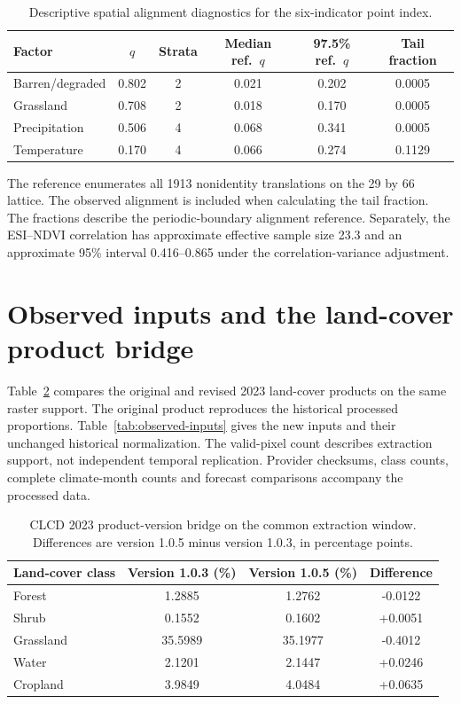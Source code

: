 \documentclass[preprint,11pt,authoryear]{elsarticle}
\begin{document}
\begin{table}[htbp]
\centering
\caption{Descriptive spatial alignment diagnostics for the six-indicator point index.}
\label{tab:spatialnull}
\footnotesize
\setlength{\tabcolsep}{3pt}
\begin{tabular}{lccccc}
\toprule
Factor & $q$ & Strata & Median ref.\ $q$ & 97.5\% ref.\ $q$ & Tail fraction \\
\midrule
Barren/degraded & 0.802 & 2 & 0.021 & 0.202 & 0.0005 \\
Grassland & 0.708 & 2 & 0.018 & 0.170 & 0.0005 \\
Precipitation & 0.506 & 4 & 0.068 & 0.341 & 0.0005 \\
Temperature & 0.170 & 4 & 0.066 & 0.274 & 0.1129 \\
\bottomrule
\end{tabular}

\vspace{2pt}
{\scriptsize The reference enumerates all 1913 nonidentity translations on the 29 by 66 lattice. The observed alignment is included when calculating the tail fraction. The fractions describe the periodic-boundary alignment reference. Separately, the ESI--NDVI correlation has approximate effective sample size 23.3 and an approximate 95\% interval 0.416--0.865 under the correlation-variance adjustment.}
\end{table}


\section{Observed inputs and the land-cover product bridge}
\label{app:observed}
Table~\ref{tab:release-bridge} compares the original and revised 2023 land-cover products on the same raster support. The original product reproduces the historical processed proportions. Table~\ref{tab:observed-inputs} gives the new inputs and their unchanged historical normalization. The valid-pixel count describes extraction support, not independent temporal replication. Provider checksums, class counts, complete climate-month counts and forecast comparisons accompany the processed data.

\begin{table}[htbp]
\centering
\caption{CLCD 2023 product-version bridge on the common extraction window. Differences are version 1.0.5 minus version 1.0.3, in percentage points.}
\label{tab:release-bridge}
\footnotesize
\begin{tabular}{lccc}
\toprule
Land-cover class & Version 1.0.3 (\%) & Version 1.0.5 (\%) & Difference \\
\midrule
Forest & 1.2885 & 1.2762 & -0.0122 \\
Shrub & 0.1552 & 0.1602 & +0.0051 \\
Grassland & 35.5989 & 35.1977 & -0.4012 \\
Water & 2.1201 & 2.1447 & +0.0246 \\
Cropland & 3.9849 & 4.0484 & +0.0635 \\
\bottomrule
\end{tabular}
\end{table}
\end{document}
